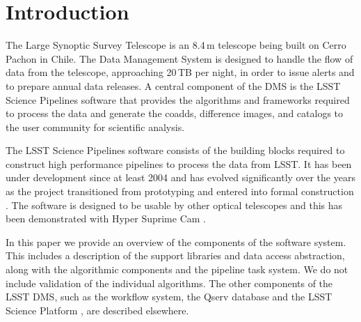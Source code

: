 \section{Introduction}

The Large Synoptic Survey Telescope \citep[LSST;][]{2019ApJ...873..111I} is an 8.4\,m telescope being built on Cerro Pachon in Chile.
The Data Management System \citep[DMS;][]{2017ASPC..512..279J} is designed to handle the flow of data from the telescope, approaching 20\,TB per night, in order to issue alerts and to prepare annual data releases.
A central component of the DMS is the LSST Science Pipelines software that provides the algorithms and frameworks required to process the data and generate the coadds, difference images, and catalogs to the user community for scientific analysis.

The LSST Science Pipelines software consists of the building blocks required to construct high performance pipelines to process the data from LSST.
It has been under development since at least 2004 \citep{2004AAS...20510811A} and has evolved significantly over the years as the project transitioned from prototyping \citep{2010SPIE.7740E..15A} and entered into formal construction \citep{2018SPIE10707E..09J}.
The software is designed to be usable by other optical telescopes and this has been demonstrated with Hyper Suprime Cam \citep{2018PASJ...70S...5B}.

In this paper we provide an overview of the components of the software system.
This includes a description of the support libraries and data access abstraction, along with the algorithmic components and the pipeline task system.
We do not include validation of the individual algorithms.
The other components of the LSST DMS, such as the workflow system, the Qserv database \citep{Wang:2011:QDS:2063348.2063364} and the LSST Science Platform \citep{LSE-319}, are described elsewhere.
